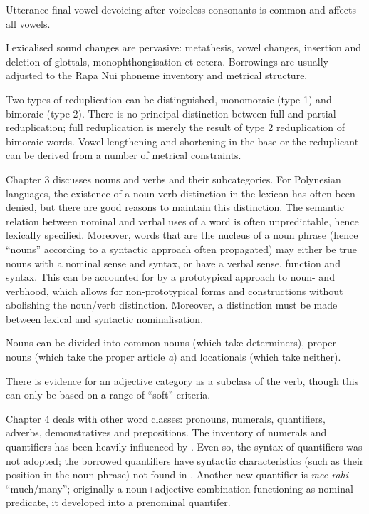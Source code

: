 Utterance-final vowel devoicing after voiceless consonants is common and affects all vowels.

Lexicalised sound changes are pervasive: metathesis, vowel changes, insertion and deletion of glottals, monophthongisation et cetera. Borrowings are usually adjusted to the Rapa Nui phoneme inventory and metrical structure.

Two types of reduplication can be distinguished, monomoraic (type 1) and bimoraic (type 2). There is no principal distinction between full and partial reduplication; full reduplication is merely the result of type 2 reduplication of bimoraic words. Vowel lengthening and shortening in the base or the reduplicant can be derived from a number of metrical constraints.

\medskip Chapter 3 discusses nouns and verbs and their subcategories. For Polynesian languages, the existence of a noun-verb distinction in the lexicon has often been denied, but there are good reasons to maintain this distinction. The semantic relation between nominal and verbal uses of a word is often unpredictable, hence lexically specified. Moreover, words that are the nucleus of a noun phrase (hence “nouns” according to a syntactic approach often propagated) may either be true nouns with a nominal sense and syntax, or have a verbal sense, function and syntax. This can be accounted for by a prototypical approach to noun- and verbhood, which allows for non-prototypical forms and constructions without abolishing the noun/verb distinction. Moreover, a distinction must be made between lexical and syntactic nominalisation.

Nouns can be divided into common nouns (which take determiners), proper nouns (which take the proper article \textit{a}) and locationals (which take neither).

There is evidence for an adjective category as a subclass of the verb, though this can only be based on a range of “soft” criteria.

\medskip Chapter 4 deals with other word classes: pronouns, numerals, quantifiers, adverbs, demonstratives and prepositions. The inventory of numerals and quantifiers has been heavily influenced by . Even so, the syntax of  quantifiers was not adopted; the borrowed quantifiers have syntactic characteristics (such as their position in the noun phrase) not found in . Another new quantifier is \textit{me{\ꞌ}e rahi} “much/many”; originally a noun+adjective combination functioning as nominal predicate, it developed into a prenominal quantifer.

